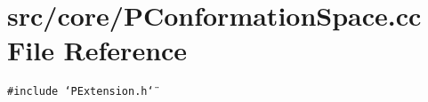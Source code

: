 \section{src/core/PConformation\-Space.cc File Reference}
\label{PConformationSpace_8cc}


{\tt \#include \char`\"{}PExtension.h\char`\"{}}\par
